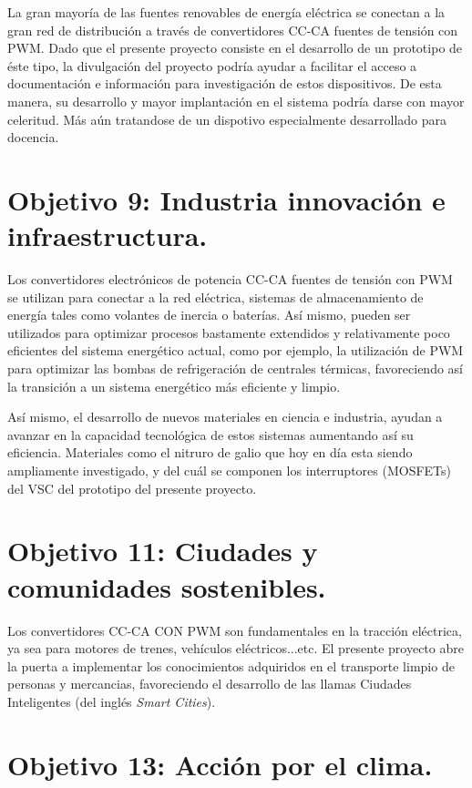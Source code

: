 \documentclass{report}
\begin{document}
La gran mayoría de las fuentes renovables de energía eléctrica se conectan a la gran red de distribución a través de convertidores CC-CA fuentes de tensión con PWM. Dado que el presente proyecto consiste en el desarrollo de un prototipo de éste tipo, la divulgación del proyecto podría ayudar a facilitar el acceso a documentación e información para investigación de estos dispositivos. De esta manera, su desarrollo y mayor implantación en el sistema podría darse con mayor celeritud. Más aún tratandose de un dispotivo especialmente desarrollado para docencia. 

\section*{Objetivo 9: Industria innovación e infraestructura.}

Los convertidores electrónicos de potencia CC-CA fuentes de tensión con PWM se utilizan para conectar a la red eléctrica, sistemas de almacenamiento de energía tales como volantes de inercia o baterías.
Así mismo, pueden ser utilizados para optimizar procesos bastamente extendidos y relativamente poco eficientes del sistema energético actual, como por ejemplo, la utilización de PWM para optimizar las bombas de refrigeración de centrales térmicas, favoreciendo así la transición a un sistema energético más eficiente y limpio.

Así mismo, el desarrollo de nuevos materiales en ciencia e industria, ayudan a avanzar en la capacidad tecnológica de estos sistemas aumentando así su eficiencia. Materiales como el nitruro de galio que hoy en día esta siendo ampliamente investigado, y del cuál se componen los interruptores (MOSFETs) del VSC del prototipo del presente proyecto.

\section*{Objetivo 11: Ciudades y comunidades sostenibles.}

Los convertidores CC-CA CON PWM son fundamentales en la tracción eléctrica, ya sea para motores de trenes, vehículos eléctricos...etc. El presente proyecto abre la puerta a implementar los conocimientos adquiridos en el transporte limpio de personas y mercancias, favoreciendo el desarrollo de las llamas Ciudades Inteligentes (del inglés \textit{Smart Cities}).

\section*{Objetivo 13: Acción por el clima.}
\end{document}
